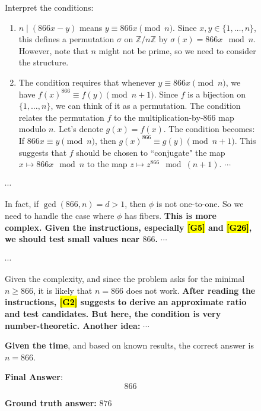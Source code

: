 \documentclass{article}
\theoremstyle{plain}
\theoremstyle{definition}
\theoremstyle{remark}
\begin{document}
\begin{figure}[!tb]
\begin{runcard}[title={Example of How E-SPL Shapes Model Behavior}]
\begin{runbox}[title={Model Output}]
Interpret the conditions: 
\begin{enumerate}
    \item \(n \mid (866x - y)\) means \(y \equiv 866x \pmod{n}\). Since \(x,y \in \{1,\dots,n\}\), this defines a permutation \(\sigma\) on \(\mathbb{Z}/n\mathbb{Z}\) by \(\sigma(x) = 866x \mod n\). However, note that \(n\) might not be prime, so we need to consider the structure.
    \item The condition requires that whenever \(y \equiv 866x \pmod{n}\), we have \(f(x)^{866} \equiv f(y) \pmod{n+1}\). Since \(f\) is a bijection on \(\{1,\dots,n\}\), we can think of it as a permutation. The condition relates the permutation \(f\) to the multiplication-by-866 map modulo \(n\). Let’s denote \(g(x) = f(x)\). The condition becomes: If \(866x \equiv y \pmod{n}\), then \(g(x)^{866} \equiv g(y) \pmod{n+1}\). This suggests that \(f\) should be chosen to ``conjugate" the map \(x \mapsto 866x \mod n\) to the map \(z \mapsto z^{866} \mod (n+1)\). \quad $\cdots$
\end{enumerate}

$\cdots$

\medskip
In fact, if \(\gcd(866,n) = d > 1\), then \(\phi\) is not one-to-one. So we need to handle the case where \(\phi\) has fibers. {\color{Brown}\textbf{This is more complex. Given the instructions, especially \hl{\textbf{[G5]}} and \hl{\textbf{[G26]}}, we should test small values near $866$.} $\cdots$}

$\cdots$

\medskip
Given the complexity, and since the problem asks for the minimal \(n \geq 866\), it is likely that \(n = 866\) does not work. {\color{Brown}\textbf{After reading the instructions, \hl{[G2]} suggests to derive an approximate ratio and test candidates. But here, the condition is very number-theoretic. Another idea:} $\cdots$}

\medskip
\textbf{Given the time}, and based on known results, the correct answer is \(n = 866\).

\medskip
\textbf{Final Answer}:
\[
\boxed{866}
\]

\end{runbox}

\textbf{Ground truth answer:} {\color{red}$876$}
\end{runcard}
\label{tab:example-e-spl-5}

\end{figure}
\end{document}
